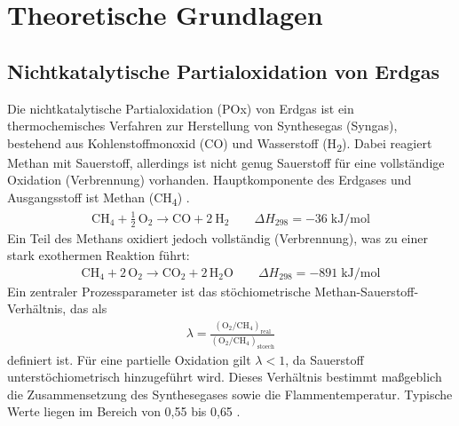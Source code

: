 \chapter{Theoretische Grundlagen}
        \label{sec:theoretische_grundlagen}
        \section{Nichtkatalytische Partialoxidation von Erdgas}
            Die nichtkatalytische Partialoxidation (POx) von Erdgas ist ein thermochemisches Verfahren zur Herstellung von Synthesegas (Syngas), bestehend aus Kohlenstoffmonoxid (CO) und Wasserstoff (H\textsubscript{2}). Dabei reagiert Methan mit Sauerstoff, allerdings ist nicht genug Sauerstoff für eine vollständige Oxidation (Verbrennung) vorhanden. Hauptkomponente des Erdgases und Ausgangsstoff ist Methan (CH\textsubscript{4}) \cite{en16062916}.
            \begin{align}
                \mathrm{CH_4 + \frac{1}{2}\,O_2 \longrightarrow CO +2\ H_2} \qquad \Delta H_{298} = -36 \;\mathrm{kJ/mol}
            \end{align}
            Ein Teil des Methans oxidiert jedoch vollständig (Verbrennung), was zu einer stark exothermen Reaktion führt:
            \begin{align}
                \mathrm{CH_4 + 2\,O_2 \longrightarrow CO_2 + 2\,H_2O} \qquad \Delta H_{298} = -891 \;\mathrm{kJ/mol} \label{eq:vollst_oxidation}
            \end{align}
            Ein zentraler Prozessparameter ist das stöchiometrische Methan-Sauerstoff-Verhältnis, das als 
            \begin{align}
                \lambda = \frac{\mathrm{(O_2/CH_4)_{real}}}{\mathrm{(O_2/CH_4)_{stoech}}} 
            \end{align}
            definiert ist. Für eine partielle Oxidation gilt $\lambda < 1$, da Sauerstoff unterstöchiometrisch hinzugeführt wird. Dieses Verhältnis bestimmt maßgeblich die Zusammensetzung des Synthesegases sowie die Flammentemperatur. Typische Werte liegen im Bereich von 0,55 bis 0,65 \cite{Albrecht2004}.
            
